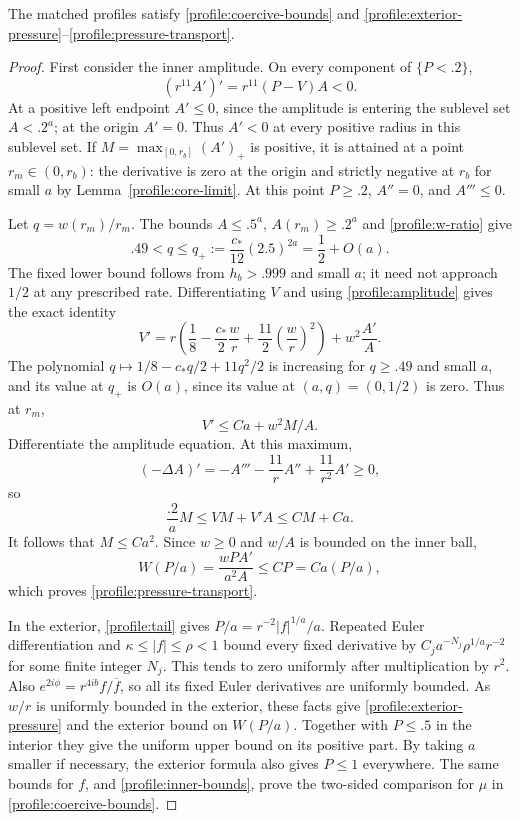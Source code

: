 \begin{lemma}
\label{profile:pressure}
The matched profiles satisfy \eqref{profile:coercive-bounds} and
\eqref{profile:exterior-pressure}--\eqref{profile:pressure-transport}.
\end{lemma}

\begin{proof}
First consider the inner amplitude.  On every component of $\{P<.2\}$,
\[
 (r^{11}A')'=r^{11}(P-V)A<0.
\]
At a positive left endpoint $A'\le0$, since the amplitude is entering
the sublevel set $A<.2^a$; at the origin $A'=0$.  Thus $A'<0$ at every
positive radius in this sublevel set.  If
$M=\max_{[0,r_b]}(A')_+$ is positive, it is attained at a point
$r_m\in(0,r_b)$: the derivative is zero at the origin and strictly
negative at $r_b$ for small $a$ by Lemma~\ref{profile:core-limit}.
At this point $P\ge.2$, $A''=0$, and $A'''\le0$.

Let $q=w(r_m)/r_m$.  The bounds $A\le.5^a$, $A(r_m)\ge.2^a$ and
\eqref{profile:w-ratio} give
\[
 .49<q\le q_+:=\frac{c_*}{12}(2.5)^{2a}=\frac12+O(a).
\]
The fixed lower bound follows from $h_b>.999$ and small $a$; it need
not approach $1/2$ at any prescribed rate.  Differentiating $V$ and
using \eqref{profile:amplitude} gives the exact identity
\[
 V'=r\left(\frac18-\frac{c_*}{2}\frac wr
                  +\frac{11}{2}\left(\frac wr\right)^2\right)
          +w^2\frac{A'}A.
\]
The polynomial $q\mapsto1/8-c_*q/2+11q^2/2$ is increasing for
$q\ge.49$ and small $a$, and its value at $q_+$ is $O(a)$, since its
value at $(a,q)=(0,1/2)$ is zero.  Thus at $r_m$,
\[
 V'\le Ca+w^2M/A.
\]
Differentiate the amplitude equation.  At this maximum,
\[
 (-\Delta A)'=-A'''-\frac{11}{r}A''+\frac{11}{r^2}A'\ge0,
\]
so
\[
 \frac{.2}{a}M\le VM+V'A\le CM+Ca.
\]
It follows that $M\le Ca^2$.  Since $w\ge0$ and $w/A$ is bounded on
the inner ball,
\[
 W(P/a)=\frac{wPA'}{a^2A}\le CP=Ca(P/a),
\]
which proves \eqref{profile:pressure-transport}.

In the exterior, \eqref{profile:tail} gives
$P/a=r^{-2}|f|^{1/a}/a$.  Repeated Euler differentiation and
$\kappa\le|f|\le\rho<1$ bound every fixed derivative by
$C_j a^{-N_j}\rho^{1/a}r^{-2}$ for some finite integer $N_j$.
This tends to zero uniformly after multiplication by $r^2$.
Also
$e^{2i\phi}=r^{4ib}f/\overline f$, so all its fixed Euler derivatives
are uniformly bounded.  As $w/r$ is uniformly bounded in the exterior,
these facts give \eqref{profile:exterior-pressure} and the exterior
bound on $W(P/a)$.  Together with $P\le.5$ in the interior they give
the uniform upper bound on its positive part.  By taking $a$ smaller
if necessary, the exterior formula also gives $P\le1$ everywhere.
The same bounds for $f$, and \eqref{profile:inner-bounds}, prove the
two-sided comparison for $\mu$ in \eqref{profile:coercive-bounds}.


\end{proof}
